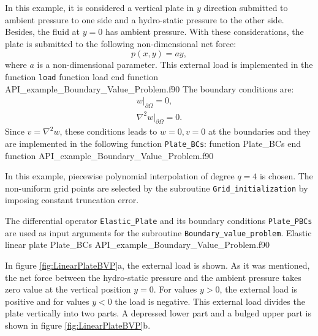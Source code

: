 In this example, it is considered a vertical plate in $y$ direction submitted to ambient pressure to one side and a hydro-static pressure to 
the other side. 
Besides, the fluid at $ y=0$ has ambient pressure. With these considerations, the plate is submitted to the following non-dimensional net 
force: 
            $$
                p(x,y) = a y,
            $$
where $ a $ is a non-dimensional parameter. This external load is implemented in the function \verb|load| 
            \vspace{0.5cm} 
                   {function load}
                   {end function}
                   {API_example_Boundary_Value_Problem.f90}
The boundary conditions  are: 
             \begin{align*}
                                w\big\rvert_{\partial \Omega}=0,  \\
                               \nabla^2 w \big\rvert_{\partial \Omega}=0. 
                   \end{align*}
Since $ v = \nabla^2  w $, these conditions leads to $ w=0, v=0 $ at the boundaries and they are implemented in the following function 
\verb|Plate_BCs|:     
              \vspace{0.5cm} 
            {function Plate_BCs}
            {end function}
            {API_example_Boundary_Value_Problem.f90}
            
In this example, piecewise polynomial interpolation of degree $ q = 4 $ is chosen. The non-uniform grid points are selected by the subroutine 
\verb|Grid_initialization| by imposing constant truncation error. 
            
The differential operator \verb|Elastic_Plate| and its boundary conditions \verb|Plate_PBCs| are used as input arguments for the subroutine 
\verb|Boundary_value_problem|. 
            \vspace{0.5cm} 
            {Elastic linear plate}
            {Plate_BCs}
            {API_example_Boundary_Value_Problem.f90}
            
In figure \ref{fig:LinearPlateBVP}a, the external load is shown. As it was mentioned, the net force between the hydro-static pressure and the 
ambient pressure takes zero value at the vertical position $ y=0$. For values $ y>0 $, the external load is positive and for values $ y<0$ 
the load is negative. This external load divides the plate vertically into two parts. A depressed lower part and a bulged upper part is shown 
in figure  \ref{fig:LinearPlateBVP}b.   
         

